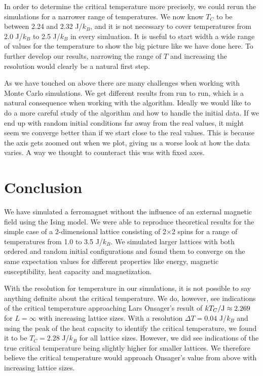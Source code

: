 \documentclass[reprint, english,notitlepage,nofootinbib]{revtex4-1}  %
\begin{document}
In order to determine the critical temperature more precisely, we could rerun the simulations for a narrower range of temperatures. We now know $T_C$ to be between 2.24 and 2.32 J/$k_B$, and it is not necessary to cover temperatures from 2.0 J/$k_B$ to 2.5 J/$k_B$ in every simluation. It is useful to start width a wide range of values for the temperature to show the big picture like we have done here. To further develop our results, narrowing the range of $T$ and increasing the resolution would clearly be a natural first step.

As we have touched on above there are many challenges when working with Monte Carlo simulations. We get different results from run to run, which is a natural consequence when working with the algorithm. Ideally we would like to do a more careful study of the algorithm and how to handle the initial data. If we end up with random initial conditions far away from the real values, it might seem we converge better than if we start close to the real values. This is because the axis gets zoomed out when we plot, giving us a worse look at how the data varies. A way we thought to counteract this was with fixed axes.



\section{Conclusion}

We have simulated a ferromagnet without the influence of an external magnetic field using the Ising model. We were able to reproduce theoretical results for the simple case of a 2-dimensional lattice consisting of 2$\times$2 spins for a range of temperatures from 1.0 to 3.5 J/$k_B$. We simulated larger lattices with both ordered and random initial configurations and found them to converge on the same expectation values for different properties like energy, magnetic susceptibility, heat capacity and magnetization.

With the resolution for temperature in our simulations, it is not possible to say anything definite about the critical temperature. We do, however, see indications of the critical temperature approaching Lars Onsager's result of $kT_C/\rm{J} \approx 2.269$ for $L = \infty$ with increasing lattice sizes. With a resolution $\Delta T = 0.04$ J/$k_B$ and using the peak of the heat capacity to identify the critical temperature, we found it to be $T_C = 2.28$ J/$k_B$ for all lattice sizes. However, we did see indications of the true critical temperature being slightly higher for smaller lattices. We therefore believe the critical temperature would approach Onsager's value from above with increasing lattice sizes.
\end{document}
